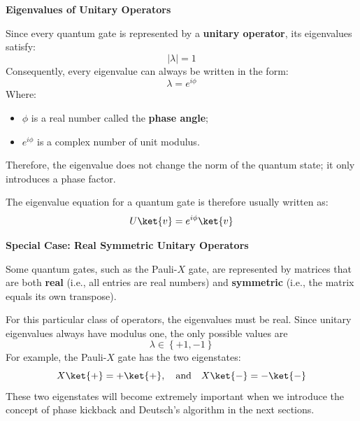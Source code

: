 \highspace
\begin{flushleft}
    \textcolor{Green3}{ \textbf{Eigenvalues of Unitary Operators}}
\end{flushleft}
Since every quantum gate is represented by a \textbf{unitary operator}, its eigenvalues satisfy:
\begin{equation*}
    \left|\lambda\right| = 1
\end{equation*}
Consequently, every eigenvalue can always be written in the form:
\begin{equation*}
    \lambda = e^{i\phi}
\end{equation*}
Where:
\begin{itemize}
    \item $\phi$ is a real number called the \textbf{phase angle};
    \item $e^{i\phi}$ is a complex number of unit modulus.
\end{itemize}
Therefore, the eigenvalue does not change the norm of the quantum state; it only introduces a phase factor.

\highspace
The eigenvalue equation for a quantum gate is therefore usually written as:
\begin{equation*}
    U\ket{v} = e^{i\phi}\ket{v}
\end{equation*}

\highspace
\begin{flushleft}
    \textcolor{Green3}{ \textbf{Special Case: Real Symmetric Unitary Operators}}
\end{flushleft}
Some quantum gates, such as the Pauli-$X$ gate, are represented by matrices that are both \textbf{real} (i.e., all entries are real numbers) and \textbf{symmetric} (i.e., the matrix equals its own transpose).

\highspace
For this particular class of operators, the eigenvalues must be real. Since unitary eigenvalues always have modulus one, the only possible values are
\begin{equation*}
    \lambda \in \left\{+1, -1\right\}
\end{equation*}
For example, the Pauli-$X$ gate has the two eigenstates:
\begin{equation*}
    X\ket{+} = +\ket{+}, \quad \text{and} \quad X\ket{-} = -\ket{-}
\end{equation*}
These two eigenstates will become extremely important when we introduce the concept of phase kickback and Deutsch's algorithm in the next sections.

